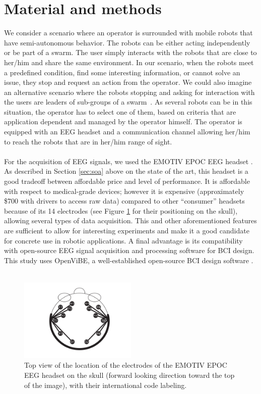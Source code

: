 \documentclass[smallextended]{svjour3}
\begin{document}
\section{Material and methods}
\label{sec:methods}
We consider a scenario where an operator is surrounded with mobile robots that have semi-autonomous behavior. 
The robots can be either acting independently or be part of a swarm. 
The user simply interacts with the robots that are close to her/him and share the same environment.
In our scenario, when the robots meet a predefined condition, find some interesting information, or cannot solve an issue, they stop and request an action from the operator. We could also imagine an alternative scenario where the robots stopping and asking for interaction with the users are leaders of sub-groups of a swarm~\cite{Goodrich2012}. As several robots can be in this situation, the operator has to select one of them, based on criteria that are application dependent and managed by the operator himself. The operator is equipped with an EEG headset and a communication channel allowing her/him to reach the robots that are in her/him range of sight. \\
\\
For the acquisition of EEG signals, we used the EMOTIV EPOC EEG headset \cite{stytsenko2011evaluation}. 
As described in Section \ref{sec:soa} above on the state of the art, this headset is a good tradeoff between affordable price and level of performance. 
It is affordable with respect to medical-grade devices; however it is expensive (approximately \$700 with drivers to access raw data) compared to other ``consumer'' headsets because of its 14 electrodes (see Figure \ref{fig:electrodes} for their positioning on the skull), allowing several types of data acquisition. 
This and other aforementioned features are sufficient to allow for interesting experiments and make it a good candidate for concrete use in robotic applications. A final advantage is its compatibility with open-source EEG signal acquisition and processing software for BCI design. This study uses OpenViBE, a well-established open-source BCI design software \cite{ov_publication}.\\
\\
\begin{figure}
\center
\includegraphics[width=0.5\textwidth]{figures/emotiv-electrodes.pdf}
\caption{Top view of the location of the electrodes of the EMOTIV EPOC EEG headset on the skull (forward looking direction toward the top of the image), with their international code labeling.} \label{fig:electrodes}
\end{figure}
\end{document}

